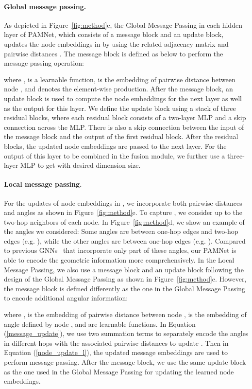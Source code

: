 \documentclass[fleqn,10pt]{wlscirep}
\newcommand{\method}{PAMNet\xspace}
\begin{document}
\paragraph{Global message passing.}
As depicted in Figure~\ref{fig:method}e, the Global Message Passing in each hidden layer of \method, which consists of a message block and an update block, updates the node embeddings  in  by using the related adjacency matrix  and pairwise distances . The message block is defined as below to perform the message passing operation:

where ,  is a learnable function,  is the embedding of pairwise distance  between node , and  denotes the element-wise production. After the message block, an update block is used to compute the node embeddings  for the next layer as well as the output  for this layer. We define the update block using a stack of three residual blocks, where each residual block consists of a two-layer MLP and a skip connection across the MLP. There is also a skip connection between the input of the message block and the output of the first residual block. After the residual blocks, the updated node embeddings  are passed to the next layer. For the output  of this layer to be combined in the fusion module, we further use a three-layer MLP to get  with desired dimension size.

\paragraph{Local message passing.} 
For the updates of node embeddings  in , we incorporate both pairwise distances  and angles  as shown in Figure~\ref{fig:method}e. To capture , we consider up to the two-hop neighbors of each node. In Figure~\ref{fig:method}d, we show an example of the angles we considered: Some angles are between one-hop edges and two-hop edges (e.g. ), while the other angles are between one-hop edges (e.g. ). Compared to previous GNNs~\cite{klicpera_dimenet_2020,klicpera_dimenetpp_2020,shui2020heterogeneous} that incorporate only part of these angles, our \method is able to encode the geometric information more comprehensively. In the Local Message Passing, we also use a message block and an update block following the design of the Global Message Passing as shown in Figure~\ref{fig:method}e. However, the message block is defined differently as the one in the Global Message Passing to encode additional angular information:

where ,  is the embedding of pairwise distance  between node ,  is the embedding of angle  defined by node , and  are learnable functions. In Equation (\ref{message_update}), we use two summation terms to separately encode the angles in different hops with the associated pairwise distances to update . Then in Equation (\ref{node_update_l}), the updated message embeddings  are used to perform message passing. After the message block, we use the same update block as the one used in the Global Message Passing for updating the learned node embeddings.
\end{document}
